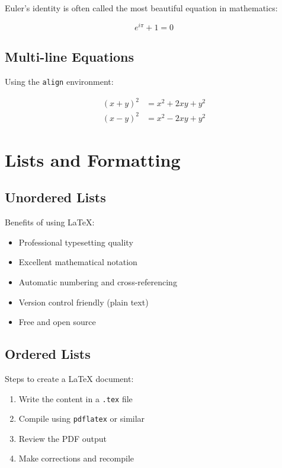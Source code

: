 \documentclass[11pt,a4paper]{article}
\begin{document}
Euler's identity is often called the most beautiful equation in mathematics:

\begin{equation}
    e^{i\pi} + 1 = 0
    \label{eq:euler}
\end{equation}

\subsection{Multi-line Equations}

Using the \texttt{align} environment:

\begin{align}
    (x + y)^2 &= x^2 + 2xy + y^2 \label{eq:expand1} \\
    (x - y)^2 &= x^2 - 2xy + y^2 \label{eq:expand2}
\end{align}

\section{Lists and Formatting}

\subsection{Unordered Lists}

Benefits of using LaTeX:
\begin{itemize}
    \item Professional typesetting quality
    \item Excellent mathematical notation
    \item Automatic numbering and cross-referencing
    \item Version control friendly (plain text)
    \item Free and open source
\end{itemize}

\subsection{Ordered Lists}

Steps to create a LaTeX document:
\begin{enumerate}
    \item Write the content in a \texttt{.tex} file
    \item Compile using \texttt{pdflatex} or similar
    \item Review the PDF output
    \item Make corrections and recompile
\end{enumerate}
\end{document}
